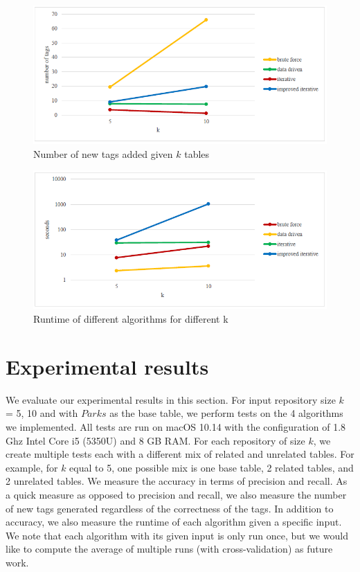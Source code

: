 \begin{figure}
    \centering
    \includegraphics[width=5in]{figures/number-of-new-tags-added-given-k-tables.png}
    \caption{Number of new tags added given $k$ tables}
    \label{fig:number-of-new-tags-added-given-k-tables}
\end{figure}

\begin{figure}
    \centering
    \includegraphics[width=5in]{figures/runtime-of-different-algorithms-for-different-k.png}
    \caption{Runtime of different algorithms for different k}
    \label{fig:runtime-of-different-algorithms-for-different-k}
\end{figure}
\section{Experimental results}
\label{sec:ExperimentalResults}

We evaluate our experimental results in this section. For input repository size $k$ = 5, 10 and with $Parks$ as the base table, we perform tests on the 4 algorithms we implemented. All tests are run on macOS 10.14 with the configuration of 1.8 Ghz Intel Core i5 (5350U) and 8 GB RAM. For each repository of size $k$, we create multiple tests each with a different mix of related and unrelated tables. For example, for $k$ equal to 5, one possible mix is one base table, 2 related tables, and 2 unrelated tables. We measure the accuracy in terms of precision and recall. As a quick measure as opposed to precision and recall, we also measure the number of new tags generated regardless of the correctness of the tags. In addition to accuracy, we also measure the runtime of each algorithm given a specific input. We note that each algorithm with its given input is only run once, but we would like to compute the average of multiple runs (with cross-validation) as future work.

